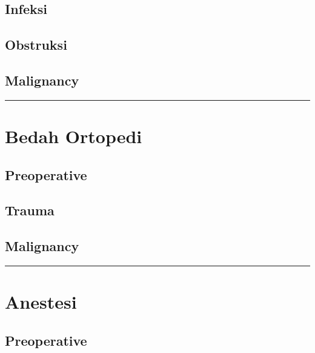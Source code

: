 \documentclass[
]{book}
\begin{document}
\hypertarget{infeksi-3}{%
\subsection{Infeksi}\label{infeksi-3}}

\hypertarget{obstruksi-2}{%
\subsection{Obstruksi}\label{obstruksi-2}}

\hypertarget{malignancy-1}{%
\subsection{Malignancy}\label{malignancy-1}}

\begin{center}\rule{0.5\linewidth}{0.5pt}\end{center}

\hypertarget{bedah-ortopedi}{%
\section{Bedah Ortopedi}\label{bedah-ortopedi}}

\hypertarget{preoperative}{%
\subsection{Preoperative}\label{preoperative}}

\hypertarget{trauma}{%
\subsection{Trauma}\label{trauma}}

\hypertarget{malignancy-2}{%
\subsection{Malignancy}\label{malignancy-2}}

\begin{center}\rule{0.5\linewidth}{0.5pt}\end{center}

\hypertarget{anestesi-1}{%
\section{Anestesi}\label{anestesi-1}}

\hypertarget{preoperative-1}{%
\subsection{Preoperative}\label{preoperative-1}}
\end{document}
